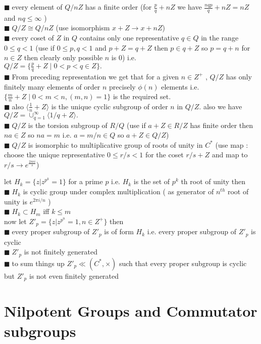\documentclass[11pt]{extarticle}
\newcommand{\ra}{\rightarrow}
\newcommand{\snote}[1]{{\footnotesize(#1)}}
\newcommand{\y}{$\blacksquare\;$}
\newcommand{\gen}[1]{\langle #1 \rangle}
\newcommand{\tbx}[2][]{
	\begin{tcolorbox}[enhanced,breakable,size=small,colback=black!2!white,title={#1},arc is angular, arc=1.5mm,drop fuzzy shadow]
		#2
	\end{tcolorbox}
}
\newcommand{\tm}{\times}
\begin{document}
\begin{multicols}{2}
\tbx[$ Q/Z $ ]{
\y every element of $ Q/nZ $ has a finite order \snote{for $ \frac{ p }{q} +nZ  $ we have $ \frac{ nqp }{q} +nZ =nZ$ and $ nq\leq \infty $ }\\
\y $ Q/Z \cong Q/nZ $ \snote{use isomorphism $ x+Z\ra x+nZ $}\\
\y every coset of $ Z $ in $ Q $ contains only one representative $ q\in Q $ in the range $ 0\leq q<1 $ \snote{use if $ 0\leq p,q<1 $ and $ p+Z=q+Z $ then $ p\in q+Z $ so $ p=q+n $ for $ n\in Z $ then clearly only possible $ n $ is $ 0 $} i.e.\\
$ Q/Z=\{\frac{ p }{q} +Z \; |\; 0<p<q\in Z\}. $ \\
\y From preceding representation we get that for a given $ n\in Z^+ $ , $Q/Z $ has only finitely many elements of order $ n $ precisely $ \phi(n) $ elements i.e.  $ \{\frac{ m }{n} +Z\;|\; 0<m<n,(m,n)=1\} $ is the required set.\\
\y also $ \gen{\frac{ 1 }{ n} +Z} $ is the unique cyclic subgroup of order $ n $ in $ Q/Z .$ also we have 
$ Q/Z=\cup_{q=1}^{\infty}\gen{1 /q+Z} .$\\
\y $ Q/Z $ is the torsion subgroup of $ R/Q $ \snote{use if $ a+Z\in R/Z $ has finite order then $ na\in Z $ so $ na=m $ i.e. $ a= m /n\in Q $ so $ a+Z\in Q/Z $}\\
\y $ Q/Z $ is isomorphic to multiplicative group of roots of unity in $ C^* $ \snote{use map : choose the unique representative $0\leq r/s<1 $ for the coset $ r/s+Z $ and map to $ r/s \ra e^{\frac{2\pi r i}{s}} $}}
\tbx[a useful example Prüfer p-group $ Z'_p $ ]
{let $ H_k=\{z|z^{p^k}=1\} $ for a prime $ p $ i.e. $ H_k $ is the set of $ p^k $ th root of unity then\\
\y $ H_k $ is cyclic group under complex multiplication \snote{ as generator of $ n^{th} $ root of unity is $ e^{2\pi i/n} $ }\\
\y $ H_k\subset H_m $ iff $ k\leq m $ \\ 
now let $ Z'_p=\{z|z^{p^n}=1, n\in Z^+\} $ then \\
\y every proper subgroup of $ Z'_p $ is of form $ H_k $ i.e. every proper subgroup of $ Z'_p $ is cyclic \\
\y $ Z'_p $ is not finitely generated \\
\y to sum things up $ Z'_p\ll(C^*,\tm) $ such that every proper subgroup is cyclic but $ Z'_p $ is not even finitely generated}


	
	\section{Nilpotent Groups and Commutator subgroups}
	

\end{multicols}
\end{document}
